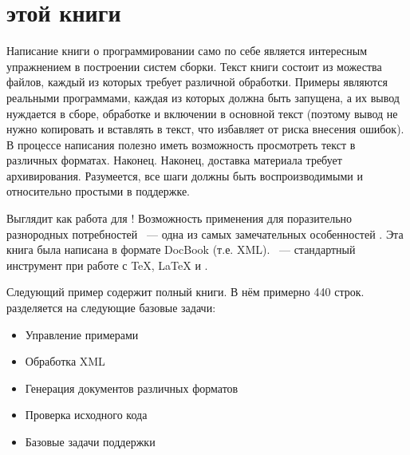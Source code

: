 \section{\Makefile{} этой книги}

Написание книги о программировании само по себе является интересным
упражнением в построении систем сборки. Текст книги состоит из
можества файлов, каждый из которых требует различной
обработки. Примеры являются реальными программами, каждая из которых
должна быть запущена, а их вывод нуждается в сборе, обработке и
включении в основной текст (поэтому вывод не нужно копировать и
вставлять в текст, что избавляет от риска внесения ошибок). В процессе
написания полезно иметь возможность просмотреть текст в различных
форматах. Наконец. Наконец, доставка материала требует
архивирования. Разумеется, все шаги должны быть воспроизводимыми и
относительно простыми в поддержке.

Выглядит как работа для \GNUmake{}! Возможность применения для
поразительно разнородных потребностей ~--- одна из самых замечательных
особенностей \GNUmake{}. Эта книга была написана в формате DocBook
(т.е. XML). \GNUmake{} ~--- стандартный инструмент при работе с
\TeX{}, \LaTeX{} и .

Следующий пример содержит полный \Makefile{} книги. В нём примерно 440
строк. \Makefile{} разделяется на следующие базовые задачи:

\begin{itemize}
  \item{} Управление примерами
  \item{} Обработка XML
  \item{} Генерация документов различных форматов
  \item{} Проверка исходного кода
  \item{} Базовые задачи поддержки
\end{itemize}

